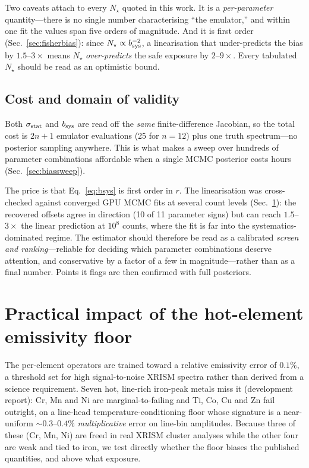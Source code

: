 \documentclass[11pt,a4paper]{article}
\begin{document}
Two caveats attach to every $N_\star$ quoted in this work. It is a
\emph{per-parameter} quantity---there is no single number characterising ``the
emulator,'' and within one fit the values span five orders of magnitude. And it
is first order (Sec.~\ref{sec:fisherbias}): since $N_\star\propto b_{\rm
sys}^{-2}$, a linearisation that under-predicts the bias by $1.5$--$3\times$
means $N_\star$ \emph{over-predicts} the safe exposure by $2$--$9\times$. Every
tabulated $N_\star$ should be read as an optimistic bound.

\subsection{Cost and domain of validity}
Both $\sigma_{\rm stat}$ and $b_{\rm sys}$ are read off the \emph{same}
finite-difference Jacobian, so the total cost is $2n{+}1$ emulator evaluations
(25 for $n=12$) plus one truth spectrum---no posterior sampling anywhere. This
is what makes a sweep over hundreds of parameter combinations affordable when a
single MCMC posterior costs hours (Sec.~\ref{sec:biassweep}).

The price is that Eq.~\eqref{eq:bsys} is first order in $r$. The linearisation
was cross-checked against converged GPU MCMC fits at several count levels
(Sec.~\ref{sec:hotfloor}): the recovered offsets agree in direction (10 of 11
parameter signs) but can reach $1.5$--$3\times$ the linear prediction at
$10^8$ counts, where the fit is far into the systematics-dominated regime.
The estimator should therefore be read as a calibrated \emph{screen and
ranking}---reliable for deciding which parameter combinations deserve
attention, and conservative by a factor of a few in magnitude---rather than as a
final number. Points it flags are then confirmed with full posteriors.

\section{Practical impact of the hot-element emissivity floor}\label{sec:hotfloor}
The per-element operators are trained toward a relative emissivity error of
$0.1\%$, a threshold set for high signal-to-noise XRISM spectra rather than
derived from a science requirement. Seven hot, line-rich iron-peak metals miss
it (development report): Cr, Mn and Ni are marginal-to-failing and Ti, Co, Cu and
Zn fail outright, on a line-head temperature-conditioning floor whose signature
is a near-uniform $\sim0.3$--$0.4\%$ \emph{multiplicative} error on line-bin
amplitudes. Because three of these (Cr, Mn, Ni) are freed in real XRISM cluster
analyses while the other four are weak and tied to iron, we test directly whether
the floor biases the published quantities, and above what exposure.
\end{document}
